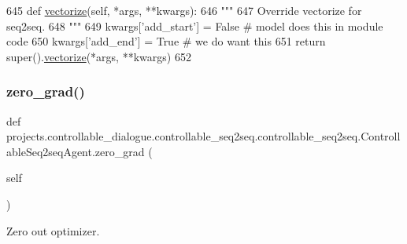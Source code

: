 \begin{DoxyCode}
645     \textcolor{keyword}{def }\hyperlink{namespaceparlai_1_1agents_1_1drqa_1_1utils_a5c76cc39e3014c7bcf9199d566dbdc0f}{vectorize}(self, *args, **kwargs):
646         \textcolor{stringliteral}{"""}
647 \textcolor{stringliteral}{        Override vectorize for seq2seq.}
648 \textcolor{stringliteral}{        """}
649         kwargs[\textcolor{stringliteral}{'add\_start'}] = \textcolor{keyword}{False}  \textcolor{comment}{# model does this in module code}
650         kwargs[\textcolor{stringliteral}{'add\_end'}] = \textcolor{keyword}{True}  \textcolor{comment}{# we do want this}
651         \textcolor{keywordflow}{return} super().\hyperlink{namespaceparlai_1_1agents_1_1drqa_1_1utils_a5c76cc39e3014c7bcf9199d566dbdc0f}{vectorize}(*args, **kwargs)
652 
\end{DoxyCode}
\mbox{\label{classprojects_1_1controllable__dialogue_1_1controllable__seq2seq_1_1controllable__seq2seq_1_1ControllableSeq2seqAgent_a72b442a0dfa9d106f7a82624823cb73e}} 
\subsubsection{\texorpdfstring{zero\+\_\+grad()}{zero\_grad()}}
{\footnotesize\ttfamily def projects.\+controllable\+\_\+dialogue.\+controllable\+\_\+seq2seq.\+controllable\+\_\+seq2seq.\+Controllable\+Seq2seq\+Agent.\+zero\+\_\+grad (\begin{DoxyParamCaption}\item[{}]{self }\end{DoxyParamCaption})}

\begin{DoxyVerb}Zero out optimizer.
\end{DoxyVerb}
 

